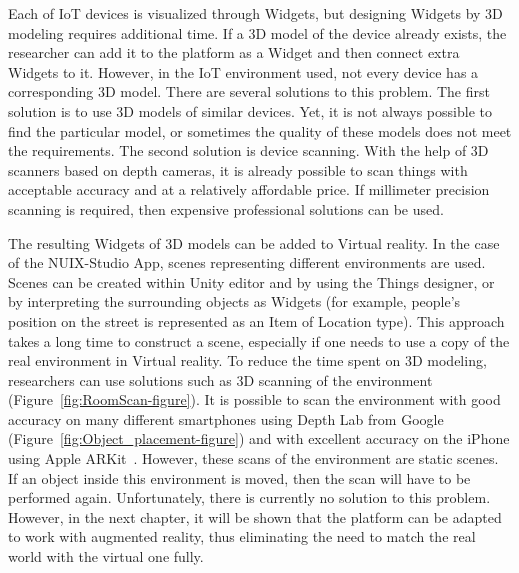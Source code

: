 Each of IoT devices is visualized through Widgets, but designing Widgets by 3D modeling requires additional time. If a 3D model of the device already exists, the researcher can add it to the platform as a Widget and then connect extra Widgets to it. However, in the IoT environment used, not every device has a corresponding 3D model. There are several solutions to this problem. The first solution is to use 3D models of similar devices. Yet, it is not always possible to find the particular model, or sometimes the quality of these models does not meet the requirements. The second solution is device scanning. With the help of 3D scanners based on depth cameras, it is already possible to scan things with acceptable accuracy and at a relatively affordable price. If millimeter precision scanning is required, then expensive professional solutions can be used.

The resulting Widgets of 3D models can be added to Virtual reality. In the case of the NUIX-Studio App, scenes representing different environments are used. Scenes can be created within Unity editor and by using the Things designer,  or by interpreting the surrounding objects as Widgets (for example, people's position on the street is represented as an Item of Location type). This approach takes a long time to construct a scene, especially if one needs to use a copy of the real environment in Virtual reality. To reduce the time spent on 3D modeling, researchers can use solutions such as 3D scanning of the environment (Figure~\ref{fig:RoomScan-figure}). It is possible to scan the environment with good accuracy on many different smartphones using Depth Lab from Google (Figure~\ref{fig:Object_placement-figure}) and with excellent accuracy on the iPhone using Apple ARKit~\cite{baek_two-dimensional_2020, breitbarth_measurement_2019}. However, these scans of the environment are static scenes. If an object inside this environment is moved, then the scan will have to be performed again. Unfortunately, there is currently no solution to this problem. However, in the next chapter, it will be shown that the platform can be adapted to work with augmented reality, thus eliminating the need to match the real world with the virtual one fully.


